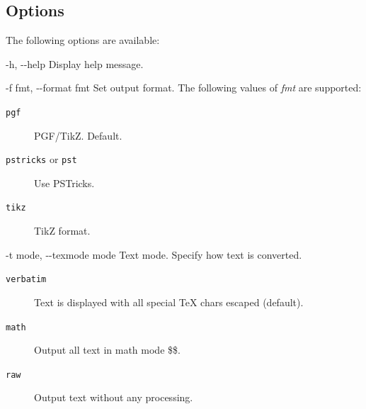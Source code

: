 \documentclass[10pt,a4paper,english]{article}
\newcommand{\optionlistlabel}[1]{\bf #1 \hfill}
\newenvironment{optionlist}[1]
{\begin{list}{}
  {\setlength{\labelwidth}{#1}
   \setlength{\rightmargin}{1cm}
   \setlength{\leftmargin}{\rightmargin}
   \addtolength{\leftmargin}{\labelwidth}
   \addtolength{\leftmargin}{\labelsep}
   \renewcommand{\makelabel}{\optionlistlabel}}
}{\end{list}}
\newcommand{\titlereference}[1]{\textsl{#1}}
\begin{document}

\hypertarget{options}{}
\subsection*{Options}
\label{options}

The following options are available:
\begin{optionlist}{3cm}
\item [-h, -{}-help]  
Display help message.
\item [-f fmt, -{}-format fmt]  
Set output format. The following values of \titlereference{fmt} are supported:
\begin{description}
\item[{\texttt{pgf}}] \leavevmode 
PGF/TikZ. Default.

\item[{\texttt{pstricks} or \texttt{pst}}] \leavevmode 
Use PSTricks.

\item[{\texttt{tikz}}] \leavevmode 
TikZ format.

\end{description}
\item [-t mode, -{}-texmode mode]  
Text mode. Specify how text is converted.
\begin{description}
\item[{\texttt{verbatim}}] \leavevmode 
Text is displayed with all special TeX chars escaped (default).

\item[{\texttt{math}}] \leavevmode 
Output all text in math mode {\$}{\$}.

\item[{\texttt{raw}}] \leavevmode 
Output text without any processing.

\end{description}


\end{optionlist}
\end{document}
